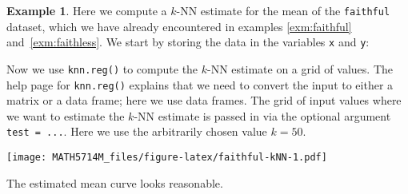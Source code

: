 \documentclass[
  a4paper,
]{article}
\newenvironment{Shaded}{\begin{snugshade}}{\end{snugshade}}
\newcommand{\AttributeTok}[1]{\textcolor[rgb]{0.77,0.63,0.00}{#1}}
\newcommand{\DecValTok}[1]{\textcolor[rgb]{0.00,0.00,0.81}{#1}}
\newcommand{\FloatTok}[1]{\textcolor[rgb]{0.00,0.00,0.81}{#1}}
\newcommand{\FunctionTok}[1]{\textcolor[rgb]{0.00,0.00,0.00}{#1}}
\newcommand{\NormalTok}[1]{#1}
\newcommand{\OtherTok}[1]{\textcolor[rgb]{0.56,0.35,0.01}{#1}}
\newcommand{\SpecialCharTok}[1]{\textcolor[rgb]{0.00,0.00,0.00}{#1}}
\newcommand{\StringTok}[1]{\textcolor[rgb]{0.31,0.60,0.02}{#1}}
\theoremstyle{definition}
\theoremstyle{definition}
\newtheorem{example}{Example}[section]
\theoremstyle{definition}
\theoremstyle{definition}
\theoremstyle{remark}
\begin{document}
\begin{example}
Here we compute a \(k\)-NN estimate for the mean of the \texttt{faithful} dataset,
which we have already encountered in examples \ref{exm:faithful} and~\ref{exm:faithless}.
We start by storing the data in the variables \texttt{x} and \texttt{y}:

\begin{Shaded}
\end{Shaded}

Now we use \texttt{knn.reg()} to compute the \(k\)-NN estimate on a grid
of values. The help page for \texttt{knn.reg()} explains that we need to
convert the input to either a matrix or a data frame; here we use
data frames. The grid of input values where we want to estimate
the \(k\)-NN estimate is passed in via the optional argument \texttt{test\ =\ ...}.
Here we use the arbitrarily chosen value \(k = 50\).

\begin{Shaded}
\end{Shaded}

\texttt{[image: MATH5714M\_files/figure-latex/faithful-kNN-1.pdf]}

The estimated mean curve looks reasonable.
\end{example}
\end{document}

